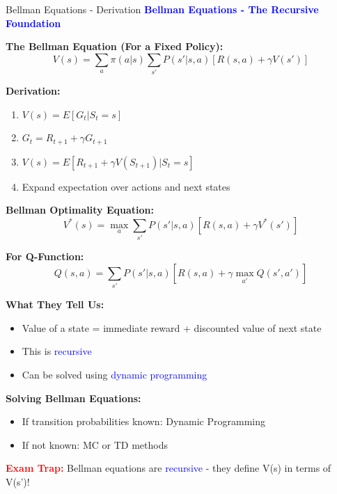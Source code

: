 \documentclass[8pt]{beamer}
\begin{document}
	\begin{frame}{Bellman Equations - Derivation}
		\fontsize{6.5}{7.5}\selectfont
		\textcolor{blue}{\textbf{Bellman Equations - The Recursive Foundation}}
		
		\textbf{The Bellman Equation (For a Fixed Policy):}
		\[
		V(s) = \sum_a \pi(a|s) \sum_{s'} P(s'|s,a) [R(s,a) + \gamma V(s')]
		\]
		
		\textbf{Derivation:}
		\begin{enumerate}
			\item $V(s) = E[G_t | S_t = s]$
			\item $G_t = R_{t+1} + \gamma G_{t+1}$
			\item $V(s) = E[R_{t+1} + \gamma V(S_{t+1}) | S_t = s]$
			\item Expand expectation over actions and next states
		\end{enumerate}
		
		\textbf{Bellman Optimality Equation:}
		\[
		V^*(s) = \max_a \sum_{s'} P(s'|s,a) [R(s,a) + \gamma V^*(s')]
		\]
		
		\textbf{For Q-Function:}
		\[
		Q(s,a) = \sum_{s'} P(s'|s,a) [R(s,a) + \gamma \max_{a'} Q(s',a')]
		\]
		
		\textbf{What They Tell Us:}
		\begin{itemize}
			\item Value of a state = immediate reward + discounted value of next state
			\item This is \textcolor{blue}{recursive}
			\item Can be solved using \textcolor{blue}{dynamic programming}
		\end{itemize}
		
		\textbf{Solving Bellman Equations:}
		\begin{itemize}
			\item If transition probabilities known: Dynamic Programming
			\item If not known: MC or TD methods
		\end{itemize}
		
		\textcolor{red}{\textbf{Exam Trap:}} Bellman equations are \textcolor{blue}{recursive} - they define V(s) in terms of V(s')!
	\end{frame}
	
\end{document}
